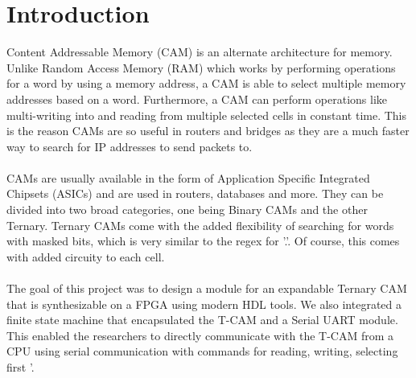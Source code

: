 \section{Introduction}
Content Addressable Memory (CAM) is an alternate architecture for memory. Unlike Random Access Memory (RAM) which works by 
performing operations for a word by using a memory address, a CAM is able to select multiple memory addresses based on a word. 
Furthermore, a CAM can perform operations like multi-writing into and reading from multiple selected cells in constant time.
This is the reason CAMs are so useful in routers and bridges as they are a much faster way to search for IP addresses to send packets to.
\\\\  
CAMs are usually available in the form of Application Specific Integrated Chipsets (ASICs) and are used in routers, databases and more.
They can be divided into two broad categories, one being Binary CAMs and the other Ternary. 
Ternary CAMs come with the added flexibility of searching for words with masked bits, which is very similar to the regex for '.'. 
Of course, this comes with added circuity to each cell. 
\\\\ 
The goal of this project was to design a module for an expandable Ternary CAM that is synthesizable on a FPGA using modern HDL tools. 
We also integrated a finite state machine that encapsulated the T-CAM and a Serial UART module. 
This enabled the researchers to directly communicate with the T-CAM from a CPU using serial communication with commands for reading, writing, selecting first '. 
